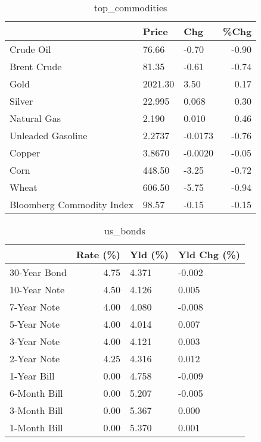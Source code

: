 \documentclass{article}%
\begin{document}
\begin{table}[htbp]%
\caption{top\_commodities}%
\centering%
\begin{adjustbox}{width=1\textwidth}%
\begin{tabular}{lllr}
\toprule
                          &   Price &     Chg &  \%Chg \\
\midrule
               Crude Oil  &   76.66 &   -0.70 & -0.90 \\
             Brent Crude  &   81.35 &   -0.61 & -0.74 \\
                    Gold  & 2021.30 &    3.50 &  0.17 \\
                  Silver  &  22.995 &   0.068 &  0.30 \\
             Natural Gas  &   2.190 &   0.010 &  0.46 \\
       Unleaded Gasoline  &  2.2737 & -0.0173 & -0.76 \\
                  Copper  &  3.8670 & -0.0020 & -0.05 \\
                    Corn  &  448.50 &   -3.25 & -0.72 \\
                   Wheat  &  606.50 &   -5.75 & -0.94 \\
Bloomberg Commodity Index &   98.57 &   -0.15 & -0.15 \\
\bottomrule
\end{tabular}
%
\end{adjustbox}%
\end{table}

%


\begin{table}[htbp]%
\caption{us\_bonds}%
\centering%
\begin{adjustbox}{width=1\textwidth}%
\begin{tabular}{lrll}
\toprule
             &  Rate (\%) & Yld (\%) & Yld Chg (\%) \\
\midrule
30-Year Bond &      4.75 &   4.371 &      -0.002 \\
10-Year Note &      4.50 &   4.126 &       0.005 \\
 7-Year Note &      4.00 &   4.080 &      -0.008 \\
 5-Year Note &      4.00 &   4.014 &       0.007 \\
 3-Year Note &      4.00 &   4.121 &       0.003 \\
 2-Year Note &      4.25 &   4.316 &       0.012 \\
 1-Year Bill &      0.00 &   4.758 &      -0.009 \\
6-Month Bill &      0.00 &   5.207 &      -0.005 \\
3-Month Bill &      0.00 &   5.367 &       0.000 \\
1-Month Bill &      0.00 &   5.370 &       0.001 \\
\bottomrule
\end{tabular}
%
\end{adjustbox}%
\end{table}
\end{document}
